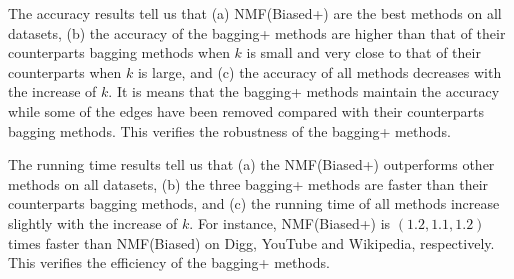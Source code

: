 \documentclass[10pt,journal,compsoc]{IEEEtran}
\newcommand{\Biased}{{\sf NMF(Biased)}\xspace}
\newcommand{\Digg}{{\sf Digg}\xspace}
\newcommand{\YouTube}{{\sf YouTube}\xspace}
\newcommand{\Wikipedia}{{\sf Wikipedia}\xspace}
\newcommand{\Biasedp}{{\sf NMF(Biased+)}\xspace}
\begin{document}
The accuracy results tell us that
(a) \Biasedp are the best methods on all datasets,
(b) the accuracy of the bagging+ methods are higher than that of
their counterparts bagging methods when $k$ is small and very
close to that of their counterparts when $k$ is large, and
(c) the accuracy of all methods decreases with the increase of $k$.
It is means that the bagging+ methods maintain the accuracy while some of the
edges have been removed compared with their counterparts bagging methods.
This verifies the robustness of the bagging+ methods.

The running time results tell us that (a) the \Biasedp outperforms
other methods on all datasets, (b) the three bagging+ methods are faster
than their counterparts bagging methods, and (c) the running time of all
methods increase slightly with the increase of $k$. For instance,
\Biasedp is $(1.2, 1.1, 1.2)$ times faster than
\Biased on \Digg, \YouTube and \Wikipedia, respectively.
This verifies the efficiency of the bagging+ methods.
\end{document}
